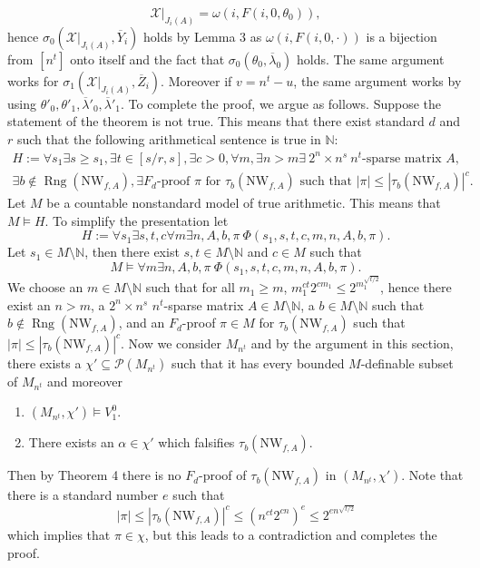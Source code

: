 \documentclass[10pt,a4paper]{article}
\begin{document}
\[\mathcal X|_{J_i(A)}=\omega(i,F(i,0,\theta_0)),\]
hence $\sigma_0(\mathcal X|_{J_i(A)},\overline Y_i)$ holds by Lemma 3 as $\omega(i,F(i,0,\cdot))$ is a bijection from $[n^t]$ onto itself and the fact that $\sigma_0(\theta_0,\overline\lambda_0)$ holds. The same argument works for $\sigma_1(\mathcal X|_{J_i(A)},\overline Z_i)$. Moreover if $v=n^t-u$, the same argument works by using $\theta'_0,\theta'_1,\overline\lambda'_0,\overline\lambda'_1$.
To complete the proof, we argue as follows. Suppose the statement of the theorem is not true. This means that there exist standard $d$ and $r$ such that the following arithmetical sentence is true in $\mathbb N$:
\begin{multline*}
H:=\forall s_1\exists s\geq s_1,\exists t\in[s/r,s],\exists c>0,\forall m,\exists n>m\exists\ 2^n\times n^s\ n^t\text{-sparse matrix }A,\\
\exists b\notin\operatorname{Rng}(\mathrm{NW}_{f,A}),\exists F_d\text{-proof }\pi\text{ for }\tau_b(\mathrm{NW}_{f,A})\text{ such that }|\pi|\leq|\tau_b(\mathrm{NW}_{f,A})|^c.
\end{multline*}
Let $M$ be a countable nonstandard model of true arithmetic. This means that $M\models H$. To simplify the presentation let
\[H:=\forall s_1\exists s,t,c\forall m\exists n,A,b,\pi\ \Phi(s_1,s,t,c,m,n,A,b,\pi).\]
Let $s_1\in M\setminus\mathbb N$, then there exist $s,t\in M\setminus\mathbb N$ and $c\in M$ such that
\[M\models\forall m\exists n,A,b,\pi\ \Phi(s_1,s,t,c,m,n,A,b,\pi).\]
We choose an $m\in M\setminus\mathbb N$ such that for all $m_1\geq m$, $m_1^{ct}2^{cm_1}\leq2^{m_1^{\sqrt{t/2}}}$, hence there exist an $n>m$, a $2^n\times n^s$ $n^t$-sparse matrix $A\in M\setminus\mathbb N$, a $b\in M\setminus\mathbb N$ such that $b\notin\operatorname{Rng}(\mathrm{NW}_{f,A})$, and an $F_d$-proof $\pi\in M$ for $\tau_b(\mathrm{NW}_{f,A})$ such that $|\pi|\leq|\tau_b(\mathrm{NW}_{f,A})|^c$. Now we consider $M_{n^t}$ and by the argument in this section, there exists a $\chi'\subseteq\mathcal P(M_{n^t})$ such that it has every bounded $M$-definable subset of $M_{n^t}$ and moreover
\begin{enumerate}
\item $(M_{n^t},\chi')\models V_1^0$.
\item There exists an $\alpha\in\chi'$ which falsifies $\tau_b(\mathrm{NW}_{f,A})$.
\end{enumerate}
Then by Theorem 4 there is no $F_d$-proof of $\tau_b(\mathrm{NW}_{f,A})$ in $(M_{n^t},\chi')$. Note that there is a standard number $e$ such that
\[|\pi|\leq|\tau_b(\mathrm{NW}_{f,A})|^c\leq(n^{ct}2^{cn})^e\leq2^{en^{\sqrt{t/2}}}\]
which implies that $\pi\in\chi$, but this leads to a contradiction and completes the proof.
\end{document}
